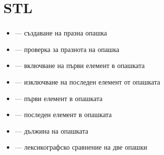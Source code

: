 \documentclass[alsotrans]{beamerswitch}
\begin{document}
\section{STL}

\begin{frame}
  \frametitle{}

  \begin{itemize}
  \item {} --- създаване на празна опашка
  \item {} --- проверка за празнота на опашка
  \item {} --- включване на първи елемент в опашката
  \item {} --- изключване на последен елемент от опашката
  \item {} --- първи елемент в опашката
  \item {} --- последен елемент в опашката
  \item {} --- дължина на опашката
  \item \lst{==,!=,<,>,<=,>=} --- лексикографско сравнение на две опашки
  \end{itemize}
\end{frame}
\end{document}
